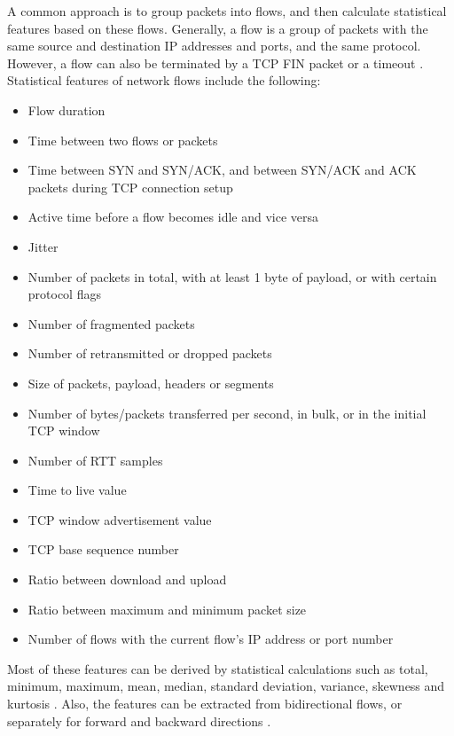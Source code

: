 \documentclass[conference]{IEEEtran}
\begin{document}
A common approach is to group packets into flows, and then calculate statistical features based on these flows. Generally, a flow is a group of packets with the same source and destination IP addresses and ports, and the same protocol. However, a flow can also be terminated by a TCP FIN packet or a timeout \cite{Ids2018}. Statistical features of network flows include the following:
\begin{itemize}
	\item Flow duration \cite{Nb2015} \cite{Ids2018}
	\item Time between two flows or packets \cite{Ids2018}
	\item Time between SYN and SYN/ACK, and between SYN/ACK and ACK packets during TCP connection setup \cite{Nb2015}
	\item Active time before a flow becomes idle and vice versa \cite{Ids2018}
	\item Jitter \cite{Nb2015}
	\item Number of packets in total, with at least 1 byte of payload, or with certain protocol flags \cite{Ids2018} \cite{waizumi2007} \cite{celik2015}
	\item Number of fragmented packets \cite{waizumi2007}
	\item Number of retransmitted or dropped packets \cite{Nb2015}
	\item Size of packets, payload, headers or segments \cite{Ids2018} \cite{celik2015}
	\item Number of bytes/packets transferred per second, in bulk, or in the initial TCP window \cite{Ids2018} \cite{celik2015}
	\item Number of RTT samples \cite{celik2015}
	\item Time to live value \cite{Nb2015}
	\item TCP window advertisement value \cite{Nb2015}
	\item TCP base sequence number \cite{Nb2015}
	\item Ratio between download and upload \cite{Ids2018}
	\item Ratio between maximum and minimum packet size \cite{celik2015}
	\item Number of flows with the current flow's IP address or port number \cite{waizumi2007} \cite{Nb2015}
\end{itemize}
Most of these features can be derived by statistical calculations such as total, minimum, maximum, mean, median, standard deviation, variance, skewness and kurtosis \cite{Ids2018} \cite{celik2015, xu2015}. Also, the features can be extracted from bidirectional flows, or separately for forward and backward directions \cite{Ids2018}.
\end{document}
